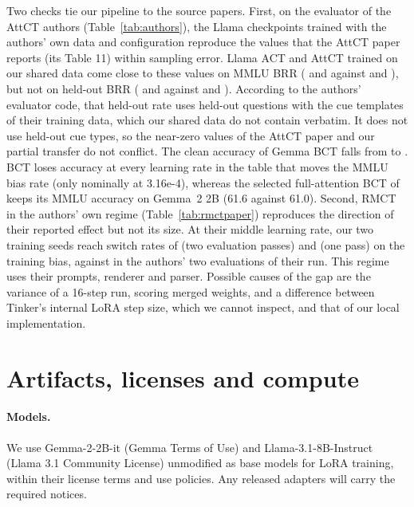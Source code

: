 \documentclass[11pt]{article}
\newcommand{\gemma}{Gemma}\newcommand{\gemmafull}{Gemma-2-2B-it}
\newcommand{\llama}{Llama}\newcommand{\llamafull}{Llama-3.1-8B-Instruct}
\begin{document}
Two checks tie our pipeline to the source papers. First, on the evaluator of the AttCT authors (Table~\ref{tab:authors}), the \llama{} checkpoints trained with the authors' own data and configuration reproduce the values that the AttCT paper reports (its Table 11) within sampling error. \llama{} ACT and AttCT trained on our shared data come close to these values on MMLU BRR (\vAELlamaOursActSFourTwoBrr{} and \vAELlamaOursAttctSFourTwoBrr{} against \vAELlamaReproActBrr{} and \vAELlamaReproAttctBrr), but not on held-out BRR (\vAELlamaOursActSFourTwoHeld{} and \vAELlamaOursAttctSFourTwoHeld{} against \vAELlamaReproActHeld{} and \vAELlamaReproAttctHeld). According to the authors' evaluator code, that held-out rate uses held-out questions with the cue templates of their training data, which our shared data do not contain verbatim. It does not use held-out cue types, so the near-zero values of the AttCT paper and our partial transfer do not conflict. The clean accuracy of \gemma{} BCT falls from \vAEGemmaBaseAcc{} to \vAEGemmaOursBctSFourTwoAcc. BCT loses accuracy at every learning rate in the table that moves the MMLU bias rate (only nominally at 3.16e-4), whereas the selected full-attention BCT of \citet{irpan2025consistency} keeps its MMLU accuracy on Gemma~2 2B (61.6 against 61.0). Second, RMCT in the authors' own regime (Table~\ref{tab:rmctpaper}) reproduces the direction of their reported effect but not its size. At their middle learning rate, our two training seeds reach switch rates of \vRPLrBTrain{} (two evaluation passes) and \vRPSeedFtTrain{} (one pass) on the training bias, against \vRPPaperLrBDA{} in the authors' two evaluations of their run. This regime uses their prompts, renderer and parser. Possible causes of the gap are the variance of a 16-step run, scoring merged weights, and a difference between Tinker's internal LoRA step size, which we cannot inspect, and that of our local implementation.


\section{Artifacts, licenses and compute}
\label{app:artifacts}
\paragraph{Models.} We use \gemmafull{} (Gemma Terms of Use) and \llamafull{} (Llama 3.1 Community License) unmodified as base models for LoRA training, within their license terms and use policies. Any released adapters will carry the required notices.
\end{document}
